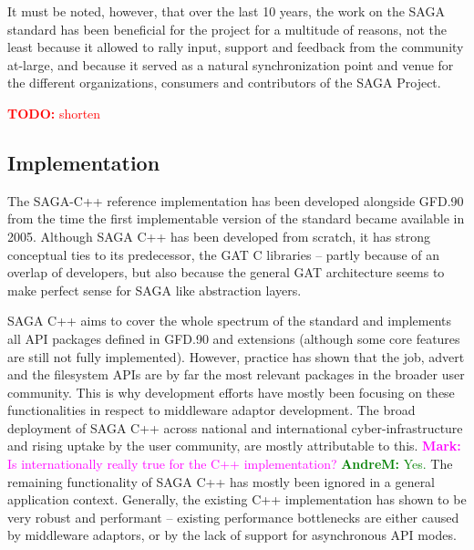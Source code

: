 \documentclass[]{article}
\newcommand{\B}[1]{\textbf{#1}}
\newcommand{\todo}[1]{{\textcolor{red}{\B{TODO:} #1 }}}
\newcommand{\amnote}[1]{{\textcolor{green}{   \B{AndreM:  } #1 }}}
\newcommand{\alnote}[1]{{\textcolor{blue}{    \B{AndreL:  } #1 }}}
\newcommand{\msnote}[1]{{\textcolor{magenta}{ \B{Mark:    } #1 }}}
\newcommand{\amnote}[1]{}
\newcommand{\alnote}[1]{}
\newcommand{\msnote}[1]{}
\begin{document}
  It must be noted, however, that over the last 10 years, the work on
  the SAGA standard has been beneficial for the project for a
  multitude of reasons, not the least because it allowed to rally
  input, support and feedback from the community at-large, and because
  it served as a natural synchronization point and venue for the
  different organizations, consumers and contributors of the SAGA
  Project.

  \todo{shorten}



\subsection{Implementation}

  The SAGA-C++ reference implementation has been developed alongside
  GFD.90 from the time the first implementable version of the standard
  became available in 2005. Although SAGA C++ has been developed from
  scratch, it has strong conceptual ties to its predecessor, the GAT
  C libraries -- partly because of an overlap of developers, but also
  because the general GAT architecture seems to make perfect sense for
  SAGA like abstraction layers.

  SAGA C++ aims to cover the whole spectrum of the standard and
  implements all API packages defined in GFD.90 and extensions
  (although some core features are still not fully implemented).
  However, practice has shown that the job, advert and the filesystem
  APIs are by far the most relevant packages in the broader user
  community.  This is why development efforts have mostly been
  focusing on these functionalities in respect to middleware adaptor
  development.  The broad deployment of SAGA C++ across national and
  international cyber-infrastructure and rising uptake by the user
  community, are mostly attributable to this. \msnote{Is internationally
  really true for the C++ implementation?}\amnote{Yes.} The remaining
  functionality of SAGA C++ has mostly been ignored in a general
  application context.  Generally, the existing C++ implementation has
  shown to be very robust and performant -- existing performance
  bottlenecks are either caused by middleware adaptors, or by the lack
  of support for asynchronous API modes.  
  
\end{document}
